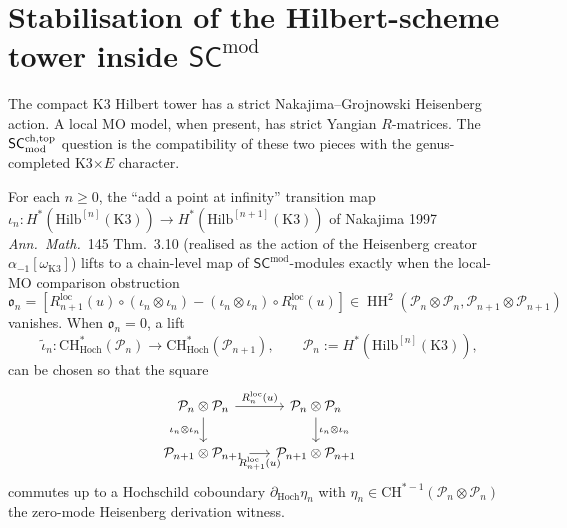 \section{Stabilisation of the Hilbert-scheme tower inside $\mathsf{SC}^{\mathrm{mod}}$}
\label{sec:msco-HS-stabilisation}

The compact K3 Hilbert tower has a strict Nakajima--Grojnowski
Heisenberg action. A local MO model, when present, has strict
Yangian $R$-matrices. The $\mathsf{SC}^{\mathrm{ch,top}}_{\mathrm{mod}}$ question is the compatibility of
these two pieces with the genus-completed K3$\times E$ character.

\begin{theorem}
\label{thm:msco-GN-stabilisation-chain-level}

For each $n\geq 0$, the ``add a point at infinity'' transition map
$\iota_n\colon H^*(\mathrm{Hilb}^{[n]}(\mathrm K3))\to
H^*(\mathrm{Hilb}^{[n+1]}(\mathrm K3))$ of Nakajima 1997
\emph{Ann.\ Math.}~145 Thm.~3.10 (realised as the action of the
Heisenberg creator $\alpha_{-1}[\omega_{\mathrm K3}]$) lifts to a
chain-level map of $\mathsf{SC}^{\mathrm{mod}}$-modules exactly when
the local-MO comparison obstruction
\[
 \mathfrak{o}_n
 =
 \left[
 R_{n+1}^{\mathrm{loc}}(u)\circ(\iota_n\otimes\iota_n)
 -(\iota_n\otimes\iota_n)\circ R_n^{\mathrm{loc}}(u)
 \right]
 \in
 \operatorname{HH}^2(\mathcal P_n\otimes\mathcal P_n,
 \mathcal P_{n+1}\otimes\mathcal P_{n+1})
\]
vanishes. When $\mathfrak{o}_n=0$, a lift
\[
 \widetilde\iota_n\colon
 \mathrm{CH}^*_{\mathrm{Hoch}}(\mathcal P_n)
 \longrightarrow
 \mathrm{CH}^*_{\mathrm{Hoch}}(\mathcal P_{n+1}),
 \qquad
 \mathcal P_n := H^*(\mathrm{Hilb}^{[n]}(\mathrm K3)),
\]
can be chosen so that the square
\[
\begin{tikzcd}[column sep=1.5em]
\mathcal P_n\otimes\mathcal P_n
\arrow[r, "R^{\mathrm{loc}}_n(u)"]
\arrow[d, "\iota_n\otimes\iota_n"'] &
\mathcal P_n\otimes\mathcal P_n
\arrow[d, "\iota_n\otimes\iota_n"] \\
\mathcal P_{n+1}\otimes\mathcal P_{n+1}
\arrow[r, "R^{\mathrm{loc}}_{n+1}(u)"'] &
\mathcal P_{n+1}\otimes\mathcal P_{n+1}
\end{tikzcd}
\]
commutes up to a Hochschild coboundary
$\partial_{\mathrm{Hoch}}\eta_n$ with
$\eta_n\in\mathrm{CH}^{*-1}(\mathcal P_n\otimes\mathcal P_n)$ the
zero-mode Heisenberg derivation witness.
\end{theorem}

